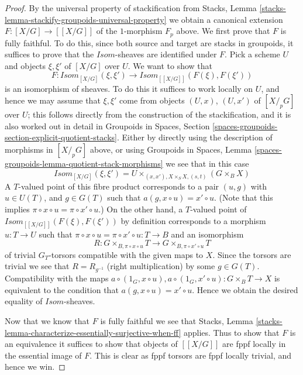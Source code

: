 \documentclass{stacks-project}
\theoremstyle{plain}
\theoremstyle{definition}
\theoremstyle{remark}
\numberwithin{equation}{subsection}
\begin{document}
\begin{proof}
\medskip\noindent
By the universal property of stackification from
Stacks, Lemma \ref{stacks-lemma-stackify-groupoids-universal-property}
we obtain a canonical extension $F : [X/G] \to [[X/G]]$ of the $1$-morphism
$F_p$ above. We first prove that $F$ is fully faithful.
To do this, since both source and target are stacks in groupoids,
it suffices to prove that the $\mathit{Isom}$-sheaves are identified
under $F$. Pick a scheme $U$ and objects $\xi, \xi'$ of
$[X/G]$ over $U$. We want to show that
$$
F :
\mathit{Isom}_{[X/G]}(\xi, \xi')
\longrightarrow
\mathit{Isom}_{[[X/G]]}(F(\xi), F(\xi'))
$$
is an isomorphism of sheaves. To do this it suffices to work locally
on $U$, and hence we may assume that $\xi, \xi'$ come from objects
$(U, x)$, $(U, x')$ of $[X/_{\!p}G]$ over $U$; this follows directly
from the construction of the stackification, and it is also worked
out in detail in
Groupoids in Spaces,
Section \ref{spaces-groupoids-section-explicit-quotient-stacks}.
Either by directly using the description of morphisms in
$[X/_{\!p}G]$ above, or using
Groupoids in Spaces,
Lemma \ref{spaces-groupoids-lemma-quotient-stack-morphisms}
we see that in this case
$$
\mathit{Isom}_{[X/G]}(\xi, \xi') =
U \times_{(x, x'), X \times_S X, (s, t)} (G \times_B X)
$$
A $T$-valued point of this fibre product corresponds to a pair
$(u, g)$ with $u \in U(T)$, and $g \in G(T)$ such that
$a(g, x \circ u) = x' \circ u$. (Note that this implies
$\pi \circ x \circ u = \pi \circ x' \circ u$.)
On the other hand, a $T$-valued
point of $\mathit{Isom}_{[[X/G]]}(F(\xi), F(\xi'))$ by definition
corresponds to a morphism $u : T \to U$ such that
$\pi \circ x \circ u = \pi \circ x' \circ u : T \to B$ and an isomorphism
$$
R :
G \times_{B, \pi \circ x \circ u} T
\longrightarrow
G \times_{B, \pi \circ x' \circ u} T
$$
of trivial $G_T$-torsors compatible with the given maps to $X$.
Since the torsors are trivial we see that $R = R_{g^{-1}}$
(right multiplication) by some $g \in G(T)$. Compatibility with the maps
$a \circ (1_G, x \circ u), a \circ (1_G, x' \circ u) : G \times_B T \to X$
is equivalent to the condition that $a(g, x \circ u) = x' \circ u$.
Hence we obtain the desired equality of $\mathit{Isom}$-sheaves.

\medskip\noindent
Now that we know that $F$ is fully faithful we see that
Stacks, Lemma \ref{stacks-lemma-characterize-essentially-surjective-when-ff}
applies. Thus to show that $F$ is an equivalence it suffices
to show that objects of $[[X/G]]$ are fppf locally in the essential image
of $F$. This is clear as fppf torsors are fppf locally trivial, and hence
we win.
\end{proof}
\end{document}
